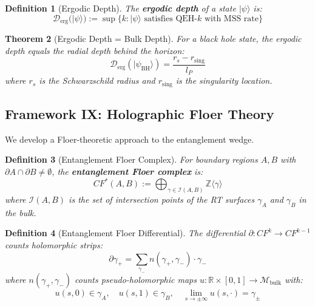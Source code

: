 \documentclass[12pt,a4paper]{article}
\newtheorem{theorem}{Theorem}[section]
\newtheorem{definition}[theorem]{Definition}
\begin{document}
\begin{definition}[Ergodic Depth]\label{def:ergodic-depth}
The \textbf{ergodic depth} of a state $|\psi\rangle$ is:
\begin{equation}
\mathcal{D}_{\text{erg}}(|\psi\rangle) := \sup \{ k : |\psi\rangle \text{ satisfies QEH-}k \text{ with MSS rate} \}
\end{equation}
\end{definition}

\begin{theorem}[Ergodic Depth = Bulk Depth]\label{thm:ergodic-bulk}
For a black hole state, the ergodic depth equals the radial depth behind the horizon:
\begin{equation}
\mathcal{D}_{\text{erg}}(|\psi_{\text{BH}}\rangle) = \frac{r_s - r_{\text{sing}}}{l_P}
\end{equation}
where $r_s$ is the Schwarzschild radius and $r_{\text{sing}}$ is the singularity location.
\end{theorem}

\subsection{Framework IX: Holographic Floer Theory}

We develop a Floer-theoretic approach to the entanglement wedge.

\begin{definition}[Entanglement Floer Complex]\label{def:ent-floer}
For boundary regions $A, B$ with $\partial A \cap \partial B \neq \emptyset$, the \textbf{entanglement Floer complex} is:
\begin{equation}
CF^*(A, B) := \bigoplus_{\gamma \in \mathcal{I}(A,B)} \mathbb{Z}\langle \gamma \rangle
\end{equation}
where $\mathcal{I}(A,B)$ is the set of intersection points of the RT surfaces $\gamma_A$ and $\gamma_B$ in the bulk.
\end{definition}

\begin{definition}[Entanglement Floer Differential]\label{def:ent-floer-diff}
The differential $\partial: CF^k \to CF^{k-1}$ counts holomorphic strips:
\begin{equation}
\partial \gamma_+ = \sum_{\gamma_-} n(\gamma_+, \gamma_-) \cdot \gamma_-
\end{equation}
where $n(\gamma_+, \gamma_-)$ counts pseudo-holomorphic maps $u: \mathbb{R} \times [0,1] \to \mathcal{M}_{\text{bulk}}$ with:
\begin{equation}
u(s, 0) \in \gamma_A, \quad u(s, 1) \in \gamma_B, \quad \lim_{s \to \pm\infty} u(s, \cdot) = \gamma_\pm
\end{equation}
\end{definition}
\end{document}
